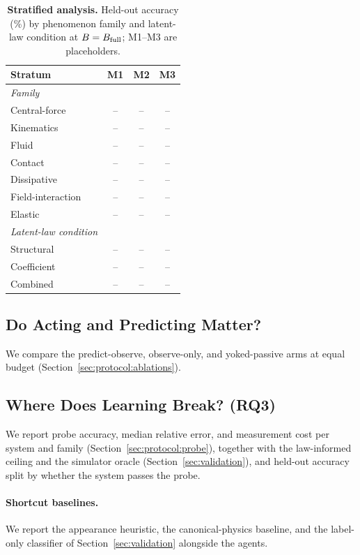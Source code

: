 \begin{table}[t]
  \centering
  \caption{\textbf{Stratified analysis.} Held-out accuracy (\%) by phenomenon family and latent-law condition at $B=B_{\rm full}$; M1--M3 are placeholders. }
  \label{tab:stratified}
  \footnotesize
  \setlength{\tabcolsep}{4pt}
  \begin{tabular}{lccc}
    \toprule
    Stratum & M1 & M2 & M3 \\
    \midrule
    \emph{Family} \\
    \quad Central-force  & -- & -- & -- \\
    \quad Kinematics     & -- & -- & -- \\
    \quad Fluid          & -- & -- & -- \\
    \quad Contact        & -- & -- & -- \\
    \quad Dissipative    & -- & -- & -- \\
    \quad Field-interaction & -- & -- & -- \\
    \quad Elastic        & -- & -- & -- \\
    \midrule
    \emph{Latent-law condition} \\
    \quad Structural     & -- & -- & -- \\
    \quad Coefficient    & -- & -- & -- \\
    \quad Combined       & -- & -- & -- \\
    \bottomrule
  \end{tabular}
\end{table}

\subsection{Do Acting and Predicting Matter?}

We compare the predict-observe, observe-only, and yoked-passive arms at equal budget (Section~\ref{sec:protocol:ablations}). 

\subsection{Where Does Learning Break? (RQ3)}

We report probe accuracy, median relative error, and measurement cost per system and family (Section~\ref{sec:protocol:probe}), together with the law-informed ceiling and the simulator oracle (Section~\ref{sec:validation}), and held-out accuracy split by whether the system passes the probe. 

\paragraph{Shortcut baselines.} We report the appearance heuristic, the canonical-physics baseline, and the label-only classifier of Section~\ref{sec:validation} alongside the agents. 
